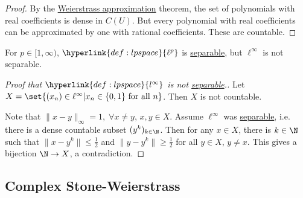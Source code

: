 \documentclass{article}
\begin{document}

\begin{proof}
    By the \hyperlink{thm:weier}{Weierstrass approximation} theorem, the set of polynomials with real coefficients is dense in $C(U)$.
    But every polynomial with real coefficients can be approximated by one with rational coefficients.
    These are countable.
\end{proof}

\begin{remark}
    For $p \in [1, \infty)$, $\hyperlink{def:lpspace}{\ell^p}$ is \hyperlink{def:separable}{separable}, but $\ell^\infty$ is not separable.
\end{remark}

\begin{proof}[Proof that $\hyperlink{def:lpspace}{l^\infty}$ is not \hyperlink{def:separable}{separable}.]
    Let $X = \set{(x_n) \in \ell^\infty | x_n \in \{0, 1\} \text{ for all } n}$.
    Then $X$ is not countable.

    Note that $\|x - y\|_\infty = 1, \; \forall x \neq y$, $x, y \in X$.
    Assume $\ell^\infty$ was \hyperlink{def:separable}{separable}, i.e. there is a dense countable subset $(y^k)_{k \in \N}$.
    Then for any $x \in X$, there is $k \in \N$ such that $\|x - y^k\| \leq \frac{1}{2}$ and $\|y - y^k\| \geq \frac{1}{2}$ for all $y \in X$, $y \neq x$.
    This gives a bijection $\N \to X$, a contradiction. %
\end{proof}


\subsection{Complex Stone-Weierstrass}
\end{document}

